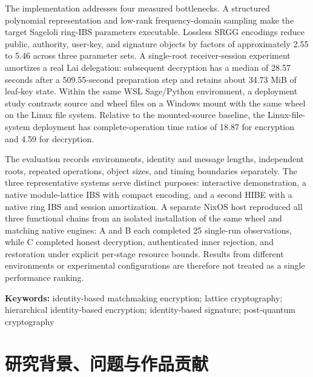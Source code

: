 \documentclass[UTF8,a4paper,12pt,oneside,openany,fontset=fandol]{ctexrep}
\newcommand{\reportheader}{全国密码技术竞赛作品设计报告}
\renewcommand{\headrulewidth}{0pt}
\renewcommand{\footrulewidth}{0pt}
\renewcommand{\headrulewidth}{0.4pt}
\renewcommand{\footrulewidth}{0pt}
\begin{document}
The implementation addresses four measured bottlenecks. A structured polynomial representation and low-rank frequency-domain sampling make the target Sageloli ring-IBS parameters executable. Lossless SRGG encodings reduce public, authority, user-key, and signature objects by factors of approximately 2.55 to 5.46 across three parameter sets. A single-root receiver-session experiment amortizes a real Lai delegation: subsequent decryption has a median of 28.57 seconds after a 509.55-second preparation step and retains about 34.73 MiB of leaf-key state. Within the same WSL Sage/Python environment, a deployment study contrasts source and wheel files on a Windows mount with the same wheel on the Linux file system. Relative to the mounted-source baseline, the Linux-file-system deployment has complete-operation time ratios of 18.87 for encryption and 4.59 for decryption.

The evaluation records environments, identity and message lengths, independent roots, repeated operations, object sizes, and timing boundaries separately. The three representative systems serve distinct purposes: interactive demonstration, a native module-lattice IBS with compact encoding, and a second HIBE with a native ring IBS and session amortization. A separate NixOS host reproduced all three functional chains from an isolated installation of the same wheel and matching native engines: A and B each completed 25 single-run observations, while C completed honest decryption, authenticated inner rejection, and restoration under explicit per-stage resource bounds. Results from different environments or experimental configurations are therefore not treated as a single performance ranking.

\raggedright\noindent\textbf{Keywords:} identity-based matchmaking encryption; lattice cryptography; hierarchical identity-based encryption; identity-based signature; post-quantum cryptography
\par\endgroup

\clearpage
\begingroup
\linespread{1.15}\selectfont
\tableofcontents
\clearpage
\endgroup
{}
\fancypagestyle{plain}{
  \fancyhf{}
  \fancyhead[C]{\small\songti\reportheader}
  \fancyfoot[C]{\small\thepage}
  \renewcommand{\headrulewidth}{0.4pt}
  \renewcommand{\footrulewidth}{0pt}
}
\pagestyle{mainmatter}

\chapter{研究背景、问题与作品贡献}
\end{document}
